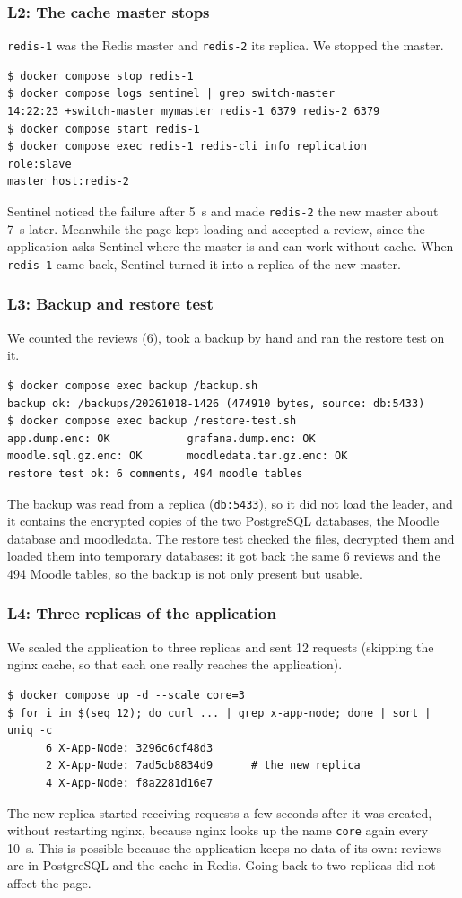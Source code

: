 \documentclass[11pt,a4paper]{article}
\newcommand{\svc}[1]{\texttt{#1}}
\begin{document}
\subsubsection*{L2: The cache master stops}

\svc{redis-1} was the Redis master and \svc{redis-2} its replica. We stopped the master.
\begin{lstlisting}
$ docker compose stop redis-1
$ docker compose logs sentinel | grep switch-master
14:22:23 +switch-master mymaster redis-1 6379 redis-2 6379
$ docker compose start redis-1
$ docker compose exec redis-1 redis-cli info replication
role:slave
master_host:redis-2
\end{lstlisting}
Sentinel noticed the failure after 5~s and made \svc{redis-2} the new master about 7~s
later. Meanwhile the page kept loading and accepted a review, since the application asks
Sentinel where the master is and can work without cache. When \svc{redis-1} came back,
Sentinel turned it into a replica of the new master.

\subsubsection*{L3: Backup and restore test}

We counted the reviews (6), took a backup by hand and ran the restore test on it.
\begin{lstlisting}
$ docker compose exec backup /backup.sh
backup ok: /backups/20261018-1426 (474910 bytes, source: db:5433)
$ docker compose exec backup /restore-test.sh
app.dump.enc: OK            grafana.dump.enc: OK
moodle.sql.gz.enc: OK       moodledata.tar.gz.enc: OK
restore test ok: 6 comments, 494 moodle tables
\end{lstlisting}
The backup was read from a replica (\texttt{db:5433}), so it did not load the leader, and
it contains the encrypted copies of the two PostgreSQL databases, the Moodle database and
moodledata. The restore test checked the files, decrypted them and loaded them into
temporary databases: it got back the same 6 reviews and the 494 Moodle tables, so the
backup is not only present but usable.

\subsubsection*{L4: Three replicas of the application}

We scaled the application to three replicas and sent 12 requests (skipping the nginx
cache, so that each one really reaches the application).
\begin{lstlisting}
$ docker compose up -d --scale core=3
$ for i in $(seq 12); do curl ... | grep x-app-node; done | sort | uniq -c
      6 X-App-Node: 3296c6cf48d3
      2 X-App-Node: 7ad5cb8834d9      # the new replica
      4 X-App-Node: f8a2281d16e7
\end{lstlisting}
The new replica started receiving requests a few seconds after it was created, without
restarting nginx, because nginx looks up the name \texttt{core} again every 10~s. This is
possible because the application keeps no data of its own: reviews are in PostgreSQL and
the cache in Redis. Going back to two replicas did not affect the page.
\end{document}
